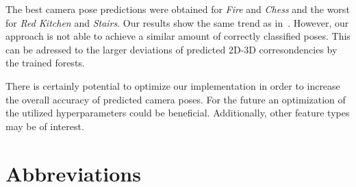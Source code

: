 \documentclass[final]{cvpr}
\begin{document}
The best camera pose predictions were obtained for \textit{Fire} and \textit{Chess} and the worst for \textit{Red Kitchen}
and \textit{Stairs}. Our results show the same trend as in~\cite{shotton2013}. However, our approach is not able
to achieve a similar amount of correctly classified poses. This can be adressed to the larger deviations of predicted
2D-3D corresondencies by the trained forests. 

There is certainly potential to optimize our implementation in order to increase the overall accuracy of predicted camera poses.
For the future an optimization of the utilized hyperparameters could be beneficial. Additionally, other feature types may be 
of interest.

\section*{Abbreviations}
\begin{acronym}
\end{acronym}

{\small


}
\end{document}

